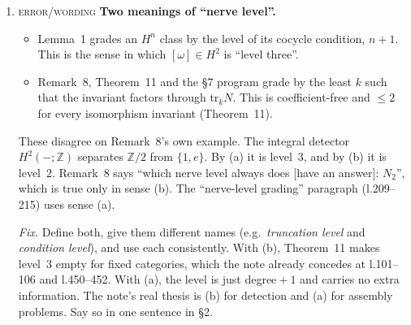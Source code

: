 \documentclass[11pt]{article}
\newcommand{\Z}{\mathbb{Z}}
\newcommand{\iss}[1]{\textsc{#1}}
\begin{document}
\begin{enumerate}[label=\textbf{N\arabic*},leftmargin=*]
\item \iss{error/wording} \textbf{Two meanings of ``nerve level''.}
\begin{itemize}[leftmargin=1.2em]
\item[(a)] Lemma~1 grades an $H^n$ class by the level of its cocycle condition, $n+1$. This is
the sense in which $[\omega]\in H^2$ is ``level three''.
\item[(b)] Remark~8, Theorem~11 and the \S7 program grade by the least $k$ such that the
invariant factors through $\mathrm{tr}_kN$. This is coefficient-free and $\le2$ for every
isomorphism invariant (Theorem~11).
\end{itemize}
These disagree on Remark~8's own example. The integral detector $H^2(-;\Z)$ separates $\Z/2$ from
$\{1,e\}$. By (a) it is level~3, and by (b) it is level~2. Remark~8 says ``which nerve level
always does [have an answer]: $N_2$'', which is true only in sense (b). The ``nerve-level
grading'' paragraph (l.209--215) uses sense (a).

\emph{Fix.} Define both, give them different names (e.g.\ \emph{truncation level} and
\emph{condition level}), and use each consistently. With (b), Theorem~11 makes level~3 empty for
fixed categories, which the note already concedes at l.101--106 and l.450--452. With (a), the
level is just degree${}+1$ and carries no extra information. The note's real thesis is (b) for
detection and (a) for assembly problems. Say so in one sentence in \S2.
\end{enumerate}
\end{document}

